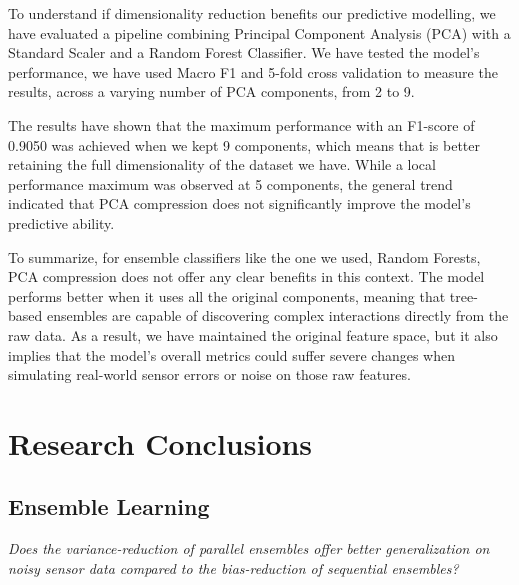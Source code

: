 \documentclass[a4paper,12pt]{article}
\begin{document}
	To understand if dimensionality reduction benefits our predictive modelling, we have evaluated a pipeline combining Principal Component Analysis (PCA) with a Standard Scaler and a Random Forest Classifier. We have tested the model's performance, we have used Macro F1 and 5-fold cross validation to measure the results, across a varying number of PCA components, from 2 to 9. 
	
	The results have shown that the maximum performance with an F1-score of 0.9050 was achieved when we kept 9 components, which means that is better retaining the full dimensionality of the dataset we have. While a local performance maximum was observed at 5 components, the general trend indicated that PCA compression does not significantly improve the model's predictive ability. 
	
	To summarize, for ensemble classifiers like the one we used, Random Forests, PCA compression does not offer any clear benefits in this context. The model performs better when it uses all the original components, meaning that tree-based ensembles are capable of discovering complex interactions directly from the raw data. As a result, we have maintained the original feature space, but it also implies that the model's overall metrics could suffer severe changes when simulating real-world sensor errors or noise on those raw features.
	
	\section{Research Conclusions}
	
	
	
	\subsection{Ensemble Learning}
	
	\textit{Does the variance-reduction of parallel ensembles offer better generalization on noisy sensor data compared to the bias-reduction of sequential ensembles?}
	
\end{document}
